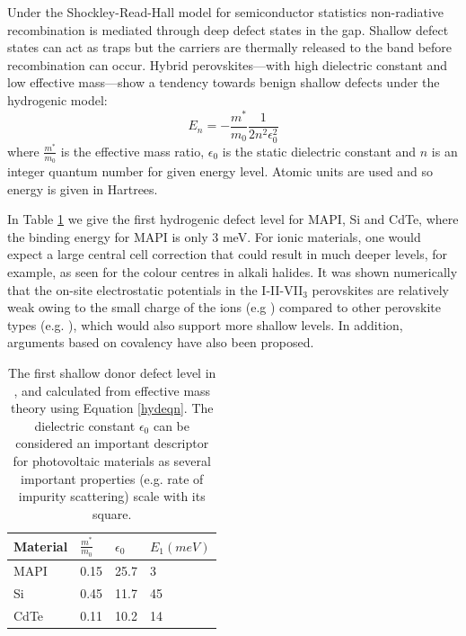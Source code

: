 Under the Shockley-Read-Hall model for semiconductor statistics non-radiative recombination is mediated through deep defect states in the gap.\autocite{PhysRev.87.835}
Shallow defect states can act as traps but the carriers are thermally released to the band before recombination can occur.
Hybrid perovskites---with high dielectric constant and low effective mass---show a tendency towards benign shallow defects under the hydrogenic model:\autocite{Yu1996}
%
\begin{equation} \label{hydeqn}
E_n = - \frac{m^*}{m_0}\frac{1}{2n^2\epsilon_0^2}
\end{equation}
%
where $\frac{m^*}{m_0}$ is the effective mass ratio, $\epsilon_0$ is the static dielectric constant and $n$ is an integer quantum number for given energy level. Atomic units are used and so energy is given in Hartrees. 

In Table \ref{tab:defectlevels} we give the first hydrogenic defect level for MAPI, Si and CdTe, where the binding energy for MAPI is only 3 meV.
For ionic materials, one would expect a large central cell correction that could result in much deeper levels, for example, as seen for the colour centres in alkali halides.\autocite{Stoneham1975}
It was shown numerically that the on-site electrostatic potentials in the I-II-VII$_3$ perovskites are relatively weak owing to the small charge of the ions (e.g ) compared to other perovskite types (e.g. ),\autocite{Brivio2014} which would also support  more shallow levels. 
In addition, arguments based on covalency have also been proposed.\autocite{Brandt2015a}

\begin{table} \centering
\caption[Donor defect levels in , Si and CdTe]{\label{tab:defectlevels}The first shallow donor defect level in ,  and  calculated from effective mass theory using Equation \ref{hydeqn}. The dielectric constant $\epsilon_0$ can be considered an important descriptor for photovoltaic materials as several important properties (e.g. rate of impurity scattering) scale with its square.}
\begin{tabular}{@{}llll@{}} \toprule   %
Material & $\frac{m^*}{m_0}$ & $\epsilon_0$ & $E_1 (meV)$ \\
\midrule
MAPI & 0.15\autocite{Frost2014b} & 25.7\autocite{Frost2014b} & 3 \\
Si & 0.45\autocite{Hava2007} & 11.7\autocite{Hava2007} &  45 \\
CdTe & 0.11\autocite{Wang2007} & 10.2\autocite{Madelung2003} & 14 \\
\bottomrule
\end{tabular}
\end{table}


